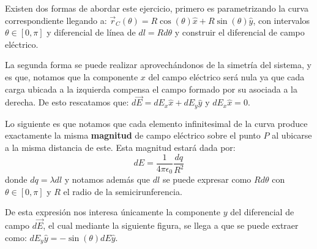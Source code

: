 \documentclass[11pt]{article}
\begin{document}
\begin{solucion}
    Existen dos formas de abordar este ejercicio, primero es parametrizando la curva correspondiente llegando a: $\vec{r}_C(\theta) = R\cos(\theta)\hat{x} + R\sin(\theta)\hat{y}$, con intervalos $\theta\in[0, \pi]$ y diferencial de línea de $dl = Rd\theta$ y construir el diferencial de campo eléctrico.

    La segunda forma se puede realizar aprovechándonos de la simetría del sistema, y es que, notamos que la componente $x$ del campo eléctrico será nula ya que cada carga ubicada a la izquierda compensa el campo formado por su asociada a la derecha. De esto rescatamos que: $d\vec{E} = dE_x\hat{x} + dE_y\hat{y}$ y $dE_x\hat{x} = 0$.

    Lo siguiente es que notamos que cada elemento infinitesimal de la curva produce exactamente la misma \textbf{magnitud} de campo eléctrico sobre el punto $P$ al ubicarse a la misma distancia de este. Esta magnitud estará dada por:
    \begin{equation}
        dE = \frac{1}{4\pi\epsilon_0} \frac{dq}{R^2}
    \end{equation}
    donde $dq = \lambda dl$ y notamos además que $dl$ se puede expresar como $Rd\theta$ con $\theta\in[0, \pi]$ y $R$ el radio de la semicirunferencia.

    De esta expresión nos interesa únicamente la componente $y$ del diferencial de campo $d\vec{E}$, el cual mediante la siguiente figura, se llega a que se puede extraer como: $dE_y\hat{y} = -\sin(\theta)dE\hat{y}$.

    \begin{center}
        \shorthandoff{>}
\end{center}
\end{solucion}
\end{document}
